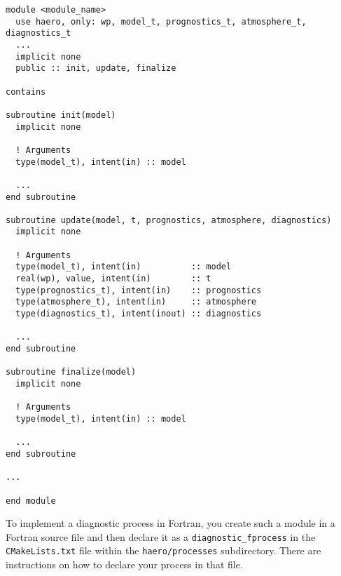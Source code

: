 \begin{lstlisting}
module <module_name>
  use haero, only: wp, model_t, prognostics_t, atmosphere_t, diagnostics_t
  ...
  implicit none
  public :: init, update, finalize

contains

subroutine init(model)
  implicit none

  ! Arguments
  type(model_t), intent(in) :: model

  ...
end subroutine

subroutine update(model, t, prognostics, atmosphere, diagnostics)
  implicit none

  ! Arguments
  type(model_t), intent(in)          :: model
  real(wp), value, intent(in)        :: t
  type(prognostics_t), intent(in)    :: prognostics
  type(atmosphere_t), intent(in)     :: atmosphere
  type(diagnostics_t), intent(inout) :: diagnostics

  ...
end subroutine

subroutine finalize(model)
  implicit none

  ! Arguments
  type(model_t), intent(in) :: model

  ...
end subroutine

...

end module
\end{lstlisting}

To implement a diagnostic process in Fortran, you create such a module in a
Fortran source file and then declare it as a \texttt{diagnostic\_fprocess} in the
\texttt{CMakeLists.txt} file within the \texttt{haero/processes} subdirectory.
There are instructions on how to declare your process in that file.

